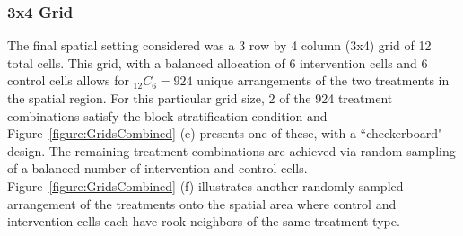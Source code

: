 \documentclass{article}[11pt]
\begin{document}





\subsubsection{3x4 Grid}

The final spatial setting considered was a 3 row by 4 column (3x4) grid of 12 total cells. This grid, with a balanced allocation of 6 intervention cells and 6 control cells allows for %
$_{12}C_{6}=924$ unique arrangements of the two treatments in the spatial region. For this particular grid size, 2 of the 924 treatment combinations satisfy the block stratification condition and Figure~\ref{figure:GridsCombined} (e) presents one of these, with a ``checkerboard" design. The remaining treatment combinations are achieved via random sampling of a balanced number of intervention and control cells. Figure~\ref{figure:GridsCombined} (f) illustrates another randomly sampled arrangement of the treatments onto the spatial area where control and intervention cells each have rook neighbors of the same treatment type.
\end{document}

